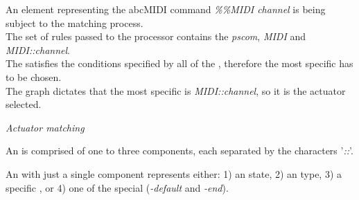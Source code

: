 \begin{program}
  An \abc{} element representing the abcMIDI command \emph{\%\%MIDI channel} is being subject to
  the \actuator{} matching process.\\

  The set of rules passed to the processor contains the \actuators{} \emph{pscom}, \emph{MIDI} and
  \emph{MIDI::channel}.\\

  The \abcelement{} satisfies the conditions specified by all of the \actuators{}, therefore the
  most specific has to be chosen.\\

  The graph dictates that the most specific \actuator{} is \emph{MIDI::channel}, so it is the
  actuator selected.

  \caption{\emph{Actuator matching}}
  \label{ex:pscom_example}
\end{program}

An \actuator{} is comprised of one to three components, each separated by the characters
'\emph{::}'.

An \actuator{} with just a single component represents either: 1) an \abc{} state, 2) an
\abcelement{} type, 3) a specific \abcelement{}, or 4) one of the special \actuators{}
(\emph{-default} and \emph{-end}).

